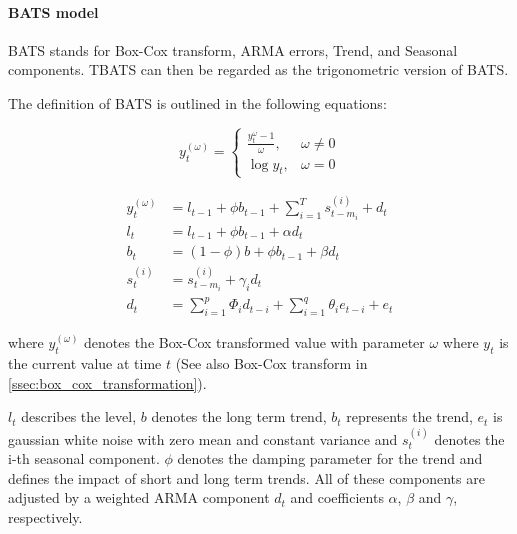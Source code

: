 \paragraph{BATS model} BATS stands for Box-Cox transform, ARMA errors, Trend, and Seasonal components. TBATS can then be regarded as the trigonometric version of BATS. 

The definition of BATS is outlined in the following equations: 


\begin{equation}
	y_t^{(\omega)} = 
	\begin{cases}
		\frac{y_t^\omega - 1}{\omega}, & \omega \neq 0 \\
		\log y_t, & \omega = 0
	\end{cases}
\end{equation}




\begin{align}
	y_t^{(\omega)} &= l_{t-1} + \phi b_{t-1} + \sum_{i=1}^T s_{t-m_i}^{(i)} + d_t\label{eq:bats_model} \\
	l_t &= l_{t-1} + \phi b_{t-1} + \alpha d_t \\
	b_t &= (1 - \phi) b + \phi b_{t-1} + \beta d_t \\
	s_t^{(i)} &= s_{t-m_i}^{(i)} + \gamma_i d_t\label{eq:bats_seasonal} \\
	d_t &= \sum_{i=1}^p \Phi_i d_{t-i} + \sum_{i=1}^q \theta_i e_{t-i} + e_t
\end{align}

where $y_t^{(\omega)}$ denotes the Box-Cox transformed value with parameter $\omega$ where $y_t$ is the current value at time $t$ (See also Box-Cox transform in \ref{ssec:box_cox_transformation}). 

$l_t$ describes the level, $b$ denotes the long term trend, $b_t$ represents the trend, $e_t$ is gaussian white noise with zero mean and constant variance and $s_t^{(i)}$ denotes the i-th seasonal component. $\phi$ denotes the damping parameter for the trend and defines the impact of short and long term trends. All of these components are adjusted by a weighted ARMA component $d_t$ and coefficients $\alpha$, $\beta$ and $\gamma$, respectively. 

